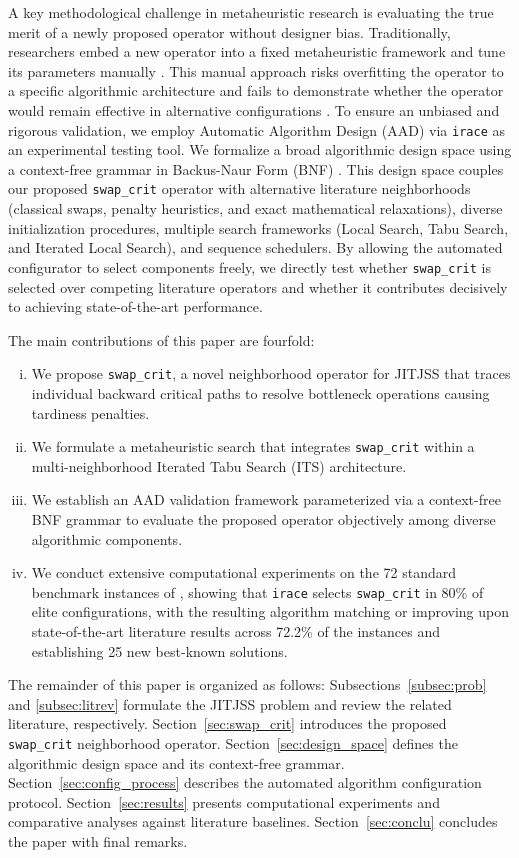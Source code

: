 A key methodological challenge in metaheuristic research is evaluating the true merit of a newly proposed operator without designer bias.
Traditionally, researchers embed a new operator into a fixed metaheuristic framework and tune its parameters manually \citep{birattari2009tuning}.
This manual approach risks overfitting the operator to a specific algorithmic architecture and fails to demonstrate whether the operator would remain effective in alternative configurations \citep{stutzle2018automated}.
To ensure an unbiased and rigorous validation, we employ Automatic Algorithm Design (AAD) via \texttt{irace} \citep{lopez2016irace} as an experimental testing tool.
We formalize a broad algorithmic design space using a context-free grammar in Backus-Naur Form (BNF) \citep{mascia2013grammars}.
This design space couples our proposed \texttt{swap\_crit} operator with alternative literature neighborhoods (classical swaps, penalty heuristics, and exact mathematical relaxations), diverse initialization procedures, multiple search frameworks (Local Search, Tabu Search, and Iterated Local Search), and sequence schedulers.
By allowing the automated configurator to select components freely, we directly test whether \texttt{swap\_crit} is selected over competing literature operators and whether it contributes decisively to achieving state-of-the-art performance.

The main contributions of this paper are fourfold:
\begin{enumerate}[(i)]
    \item We propose \texttt{swap\_crit}, a novel neighborhood operator for JITJSS that traces individual backward critical paths to resolve bottleneck operations causing tardiness penalties.
    \item We formulate a metaheuristic search that integrates \texttt{swap\_crit} within a multi-neighborhood Iterated Tabu Search (ITS) architecture.
    \item We establish an AAD validation framework parameterized via a context-free BNF grammar to evaluate the proposed operator objectively among diverse algorithmic components.
    \item We conduct extensive computational experiments on the 72 standard benchmark instances of \citet{baptiste2008lagrangian}, showing that \texttt{irace} selects \texttt{swap\_crit} in 80\% of elite configurations, with the resulting algorithm matching or improving upon state-of-the-art literature results across 72.2\% of the instances and establishing 25 new best-known solutions.
\end{enumerate}

The remainder of this paper is organized as follows:
Subsections~\ref{subsec:prob} and \ref{subsec:litrev} formulate the JITJSS problem and review the related literature, respectively.
Section~\ref{sec:swap_crit} introduces the proposed \texttt{swap\_crit} neighborhood operator.
Section~\ref{sec:design_space} defines the algorithmic design space and its context-free grammar.
Section~\ref{sec:config_process} describes the automated algorithm configuration protocol.
Section~\ref{sec:results} presents computational experiments and comparative analyses against literature baselines.
Section~\ref{sec:conclu} concludes the paper with final remarks.
